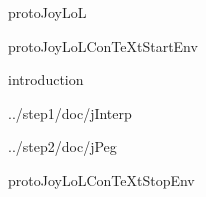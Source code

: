 
\usemodule[t-diSimp]

\startDiSimpComponent protoJoyLoL

\diSimpEnvironment protoJoyLoLConTeXtStartEnv

\diSimpComponent introduction

\diSimpComponent ../step1/doc/jInterp

\diSimpComponent ../step2/doc/jPeg

\diSimpEnvironment protoJoyLoLConTeXtStopEnv

\stopDiSimpComponent
